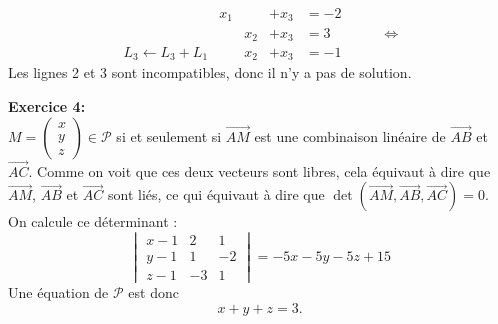 \documentclass{article}
\begin{document}
\begin{enumerate}
\[
\begin{matrix} 
                               & x_1 & & +x_3 & =-2 \\
                                 &      &x_2  &+x_3 & = 3 \\
 L_3 \leftarrow L_3 + L_1  &  &x_2   &+x_3    & =-1
 \end{matrix}
\hspace{1cm} \Leftrightarrow 
\]
Les lignes 2 et 3 sont incompatibles, donc il n'y a pas de solution.
\end{enumerate}

\medskip
\noindent
\textbf{Exercice 4:}\\
$M = \begin{pmatrix}
x\\y\\z
\end{pmatrix} \in \mathcal{P}$ si et seulement si  
$\overrightarrow{AM}$ est une combinaison linéaire de 
$\overrightarrow{AB}$ et 
$\overrightarrow{AC}$. Comme on voit que ces deux vecteurs sont libres, cela équivaut à dire que 
$\overrightarrow{AM}$, $\overrightarrow{AB}$ et 
$\overrightarrow{AC}$ sont liés, ce qui équivaut à dire que 
$\det ( \overrightarrow{AM}, \overrightarrow{AB} , \overrightarrow{AC})=0$.
On calcule ce déterminant : \\
\[\begin{vmatrix}
x-1 & 2 & 1 \\
y-1 & 1 & -2 \\
z-1 & -3 & 1
\end{vmatrix}
= -5x -5y-5z+15 \]
Une équation de $\mathcal{P}$ est donc 
\[ x+y+z =3 .\]
\end{document}
